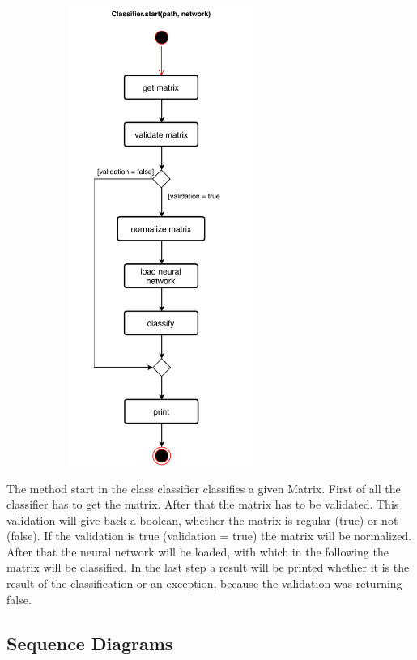 \documentclass[parskip=full]{scrartcl}
\begin{document}
\begin{figure}[h]
\begin{center}
\includegraphics[width=8cm,height=15cm,keepaspectratio]{ActivityDiagrams/PDF/classification}
\label{Activity Diagrams}
\end{center}
\end{figure}

\newpage
The method start in the class classifier classifies a given Matrix.
First of all the classifier has to get the matrix. 
After that the matrix has to be validated.
This validation will give back a boolean, whether the matrix is regular (true) or not (false).
If the validation is true (validation = true) the matrix will be normalized.
After that the \gls{neural network} will be loaded, with which in the following the matrix will be classified.
In the last step a result will be printed whether it is the result of the classification or an exception, because the validation was returning false.

 
\newpage
\subsection{Sequence Diagrams} 
\end{document}
